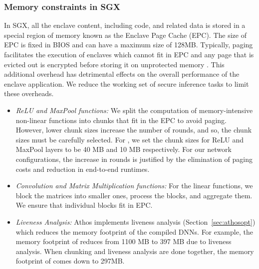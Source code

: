  
\subsubsection{Memory constraints in SGX}
In SGX, all the enclave content, including code, and related data is stored in a special region of memory known as the Enclave Page Cache (EPC). The size of EPC is fixed in BIOS and can have a maximum size of 128MB. Typically, paging facilitates the execution of enclaves which cannot fit in EPC and any page that is evicted out is encrypted before storing it on unprotected memory \cite{intelsgxperf}. This additional overhead  has  detrimental effects on the overall performance of the enclave application. 
We reduce the working set of secure inference tasks to limit these overheads.
\begin{itemize}
	\item \textit{ReLU and MaxPool functions:} 
  We split the computation of memory-intensive non-linear functions into chunks that fit in the EPC to avoid paging. However, lower chunk sizes  increase  the number of rounds, and so, the chunk sizes must be carefully selected. For \resnet, we  set the chunk sizes for ReLU and MaxPool layers to be 40 MB and 10 MB respectively. For our network configurations, the increase in rounds is justified by the elimination of paging costs and reduction in end-to-end runtimes.
	\item \textit{Convolution and Matrix Multiplication functions:} For the linear functions, we block the matrices into smaller ones, process the blocks, and aggregate them. We ensure that individual blocks fit in EPC. 
	\item \textit{Liveness Analysis:} Athos implements liveness analysis (Section~\ref{sec:athosopt}) which reduces the memory footprint of the compiled DNNs.  For example, the memory footprint of \resnet reduces from 1100 MB to 397 MB due to liveness analysis. When chunking and liveness analysis are done together, the memory footprint of \resnet comes down to 297MB.

\end{itemize}

